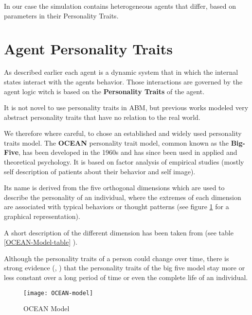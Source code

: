 In our case the simulation contains heterogeneous agents that differ, based on parameters
in their Personality Traits. 

\label{BigFive}
\section{Agent Personality Traits}
As described earlier each agent is a dynamic system that in which the internal states
interact with the agents behavior. Those interactions are governed by the agent logic
witch is based on the \textbf{Personality Traits} of the agent.

It is not novel to use personality traits in ABM, but previous works\cite{Gautam2009}
modeled very abstract personality traits that have no relation to the real world.

We therefore where careful, to chose an established and widely used personality traits model.
The \textbf{OCEAN} personality trait model\cite{Tupes1961}, common known as the \textbf{Big-Five}, has been developed
in the 1960s and has since been used in applied and theoretical psychology.
It is based on factor analysis of empirical studies (mostly self description of patients about their
behavior and self image).

Its name is derived from the five orthogonal dimensions which are used to describe
the personality of an individual, where the extremes of each dimension are associated
with typical behaviors or thought patterns (see figure \ref{OCEAN-Model} for a graphical
representation).

A short description of the different dimension has been taken from\cite{Ehrler1999}
(see table \ref{OCEAN-Model-table} ).

Although the personality traits of a person could change over time, there is strong
evidence (\cite{Soldz1999}, \cite{Cobb-Clark2012}) that the personality traits of
the big five model stay more or less constant over a long period of time or even
the complete life of an individual.

\begin{figure}[h]
    \centering
    \texttt{[image: OCEAN-model]} 
    \caption{OCEAN Model}
    \label{OCEAN-Model}
\end{figure}

